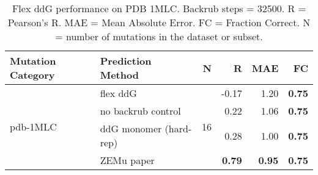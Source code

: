 \begin{table}
  \begin{tabular}{llrrrr}
\toprule
Mutation Category &       Prediction Method &   N &     R &  MAE &   FC \\
\midrule
 \multirow{ 4}{*}{pdb-1MLC} & flex ddG & \multirow{ 4}{*}{16} & -0.17 & 1.20 & \textbf{0.75}  \\
 & no backrub control & & 0.22 & 1.06 & \textbf{0.75}  \\
 & ddG monomer (hard-rep) & & 0.28 & 1.00 & \textbf{0.75}  \\
 & ZEMu paper & & \textbf{0.79} & \textbf{0.95} & \textbf{0.75}  \\
\bottomrule
\end{tabular}
  \caption[Flex ddG performance on PDB 1MLC]{
    Flex ddG performance on PDB 1MLC. Backrub steps = 32500. R = Pearson's R. MAE = Mean Absolute Error. FC = Fraction Correct. N = number of mutations in the dataset or subset.
  } \label{tab:table-pdb-1MLC}
\end{table}
